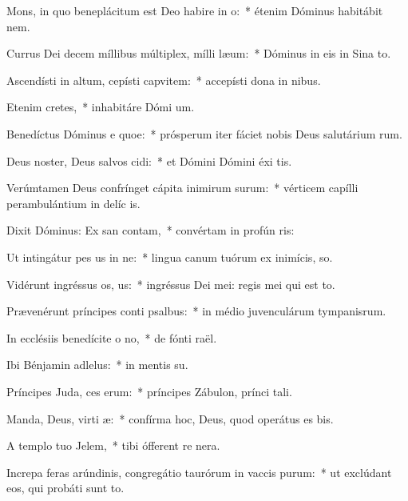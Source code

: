 \item Mons, in quo beneplácitum est Deo habire in o:~* étenim Dóminus habitábit  nem.
\item Currus Dei decem míllibus múltiplex, mílli læum:~* Dóminus in eis in Sina  to.
\item Ascendísti in altum, cepísti capvitem:~* accepísti dona in nibus.
\item Etenim  cretes,~* inhabitáre Dómi um.
\item Benedíctus Dóminus e quoe:~* prósperum iter fáciet nobis Deus salutárium rum.
\item Deus noster, Deus salvos cidi:~* et Dómini Dómini éxi tis.
\item Verúmtamen Deus confrínget cápita inimirum surum:~* vérticem capílli perambulántium in delíc is.
\item Dixit Dóminus: Ex san contam,~* convértam in profún ris:
\item Ut intingátur pes us in ne:~* lingua canum tuórum ex inimícis,  so.
\item Vidérunt ingréssus os, us:~* ingréssus Dei mei: regis mei qui est  to.
\item Prævenérunt príncipes conti psalbus:~* in médio juvenculárum tympanisrum.
\item In ecclésiis benedícite o no,~* de fónti raël.
\item Ibi Bénjamin adlelus:~* in mentis su.
\item Príncipes Juda, ces erum:~* príncipes Zábulon, prínci tali.
\item Manda, Deus, virti æ:~* confírma hoc, Deus, quod operátus es  bis.
\item A templo tuo  Jelem,~* tibi ófferent re nera.
\item Increpa feras arúndinis, congregátio taurórum in vaccis purum:~* ut exclúdant eos, qui probáti sunt to.
